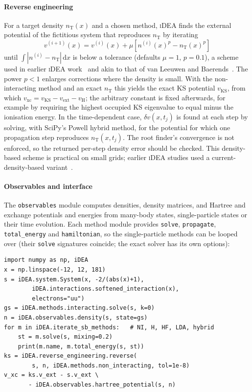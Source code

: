 \documentclass[5p,times,twocolumn]{elsarticle}
\newcommand{\iDEA}{\textsc{iDEA}}
\newcommand{\vext}{v_\mathrm{ext}}
\newcommand{\vks}{v_\mathrm{KS}}
\newcommand{\vxc}{v_\mathrm{xc}}
\newcommand{\vH}{v_\mathrm{H}}
\begin{document}
\paragraph{Reverse engineering}
For a target density $n_\mathrm{T}(x)$ and a chosen method, \iDEA{} finds the external potential of the fictitious system that reproduces $n_\mathrm{T}$ by iterating
\begin{equation}
v^{(i+1)}(x)=v^{(i)}(x)+\mu\left[n^{(i)}(x)^{p}-n_\mathrm{T}(x)^{p}\right]
\label{eq:re}
\end{equation}
until $\int|n^{(i)}-n_\mathrm{T}|\,\mathrm{d}x$ is below a tolerance (defaults $\mu=1$, $p=0.1$), a scheme used in earlier \iDEA{} work~\cite{Hodgson2013,Hodgson2016} and akin to that of van Leeuwen and Baerends~\cite{vanLeeuwen1994}. The power $p<1$ enlarges corrections where the density is small. With the non-interacting method and an exact $n_\mathrm{T}$ this yields the exact KS potential $\vks$, from which $\vxc=\vks-\vext-\vH$; the arbitrary constant is fixed afterwards, for example by requiring the highest occupied KS eigenvalue to equal minus the ionisation energy. In the time-dependent case, $\delta v(x,t_j)$ is found at each step by solving, with SciPy's Powell hybrid method, for the potential for which one propagation step reproduces $n_\mathrm{T}(x,t_j)$. The root finder's convergence is not enforced, so the returned per-step density error should be checked. This density-based scheme is practical on small grids; earlier \iDEA{} studies used a current-density-based variant~\cite{Hodgson2013}.

\paragraph{Observables and interface}
The \texttt{observables} module computes densities, density matrices, and Hartree and exchange potentials and energies from many-body states, single-particle states or their time evolution. Each method module provides \texttt{solve}, \texttt{propagate}, \texttt{total\_energy} and \texttt{hamiltonian}, so the single-particle methods can be looped over (their \texttt{solve} signatures coincide; the exact solver has its own options):
\begin{lstlisting}
import numpy as np, iDEA
x = np.linspace(-12, 12, 181)
s = iDEA.system.System(x, -2/(abs(x)+1),
        iDEA.interactions.softened_interaction(x),
        electrons="uu")
gs = iDEA.methods.interacting.solve(s, k=0)
n = iDEA.observables.density(s, state=gs)
for m in iDEA.iterate_sb_methods:   # NI, H, HF, LDA, hybrid
    st = m.solve(s, mixing=0.2)
    print(m.name, m.total_energy(s, st))
ks = iDEA.reverse_engineering.reverse(
        s, n, iDEA.methods.non_interacting, tol=1e-8)
v_xc = ks.v_ext - s.v_ext \
       - iDEA.observables.hartree_potential(s, n)
\end{lstlisting}
\end{document}

